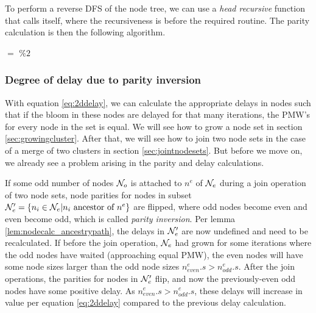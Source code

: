 To perform a reverse DFS of the node tree, we can use a \emph{head recursive} function that calls itself, where the recursiveness is before the required routine. The parity calculation is then the following algorithm.
\begin{algo}[algotitle=CalcParity, label=al:calcparity]
\begin{algorithm}[H]

\KwData{\node}

\BlankLine

\parity $=$  $\%2$\;
\end{algorithm}
\end{algo}


\subsubsection{Degree of delay due to parity inversion }

With equation \ref{eq:2ddelay}, we can calculate the appropriate delays in nodes such that if the bloom in these nodes are delayed for that many iterations, the PMW's for every node in the set is equal. We will see how to grow a node set in section \ref{sec:growingcluster}. After that, we will see how to join two node sets in the case of a merge of two clusters in section \ref{sec:jointnodesets}. But before we move on, we already see a problem arising in the parity and delay calculations.

If some odd number of nodes $\mathcal{N}_o$ is attached to $n^e$ of $\mathcal{N}_e$ during a join operation of two node sets, node parities for nodes in subset $\mathcal{N}_e'= \{n_i \in \mathcal{N}_e | n_i \mbox{ ancestor of } n^e\}$ are flipped, where odd nodes become even and even become odd, which is called \emph{parity inversion}. Per lemma \ref{lem:nodecalc_ancestrypath}, the delays in $\mathcal{N}_e'$ are now undefined and need to be recalculated. If before the join operation, $\mathcal{N}_e$ had grown for some iterations where the odd nodes have waited (approaching equal PMW), the even nodes will have some node sizes larger than the odd node sizes $n^e_{even}.s > n^e_{odd}.s$. After the join operations, the parities for nodes in $\mathcal{N}_e'$ flip, and now the previously-even odd nodes have some positive delay. As $n^e_{even}.s > n^e_{odd}.s$, these delays will increase in value per equation \ref{eq:2ddelay} compared to the previous delay calculation.

